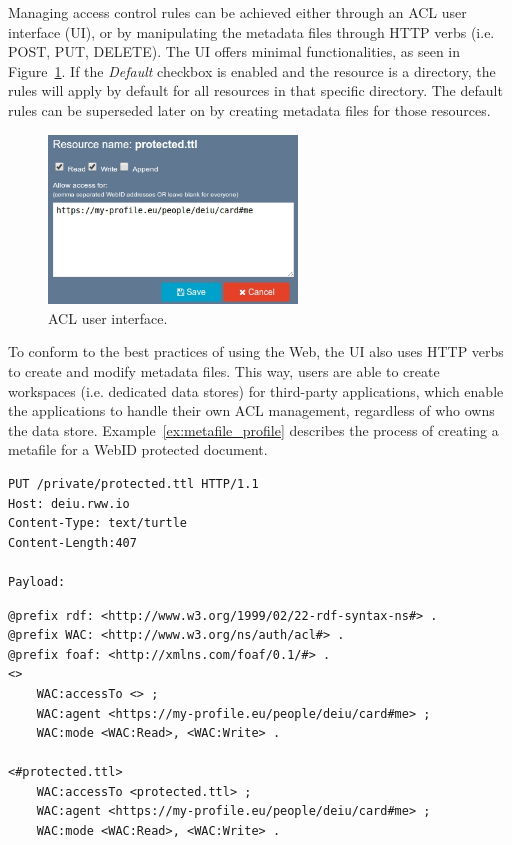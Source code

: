 Managing access control rules can be achieved either through an ACL user interface (UI), or by manipulating the metadata files through HTTP verbs (i.e. POST, PUT, DELETE). The UI offers minimal functionalities, as seen in Figure~\ref{fig:acl_ui}. If the \textit{Default} checkbox is enabled and the resource is a directory, the rules will apply by default for all resources in that specific directory. The default rules can be superseded later on by creating metadata files for those resources.\\

\begin{figure}[h]
  \begin{center}
    \includegraphics[width=250px]{img/screens/acl_ui.jpg}
        \caption{ACL user interface.}
        \label{fig:acl_ui}
  \end{center}
\end{figure}

To conform to the best practices of using the Web, the UI also uses HTTP verbs to create and modify metadata files. This way, users are able to create workspaces (i.e. dedicated data stores) for third-party applications, which enable the applications to handle their own ACL management, regardless of who owns the data store. Example~\ref{ex:metafile_profile} describes the process of creating a metafile for a WebID protected document.\\

\begin{example}[h]
\begin{verbatim}
PUT /private/protected.ttl HTTP/1.1
Host: deiu.rww.io
Content-Type: text/turtle
Content-Length:407

Payload:
\end{verbatim}
\begin{verbatim}
@prefix rdf: <http://www.w3.org/1999/02/22-rdf-syntax-ns#> .
@prefix WAC: <http://www.w3.org/ns/auth/acl#> .
@prefix foaf: <http://xmlns.com/foaf/0.1/#> .
<>
    WAC:accessTo <> ;
    WAC:agent <https://my-profile.eu/people/deiu/card#me> ;
    WAC:mode <WAC:Read>, <WAC:Write> .

<#protected.ttl>
    WAC:accessTo <protected.ttl> ;
    WAC:agent <https://my-profile.eu/people/deiu/card#me> ;
    WAC:mode <WAC:Read>, <WAC:Write> .
\end{verbatim}
\caption{Creating a metafile for the document \textit{/private/protected.ttl}.}
\label{ex:metafile_profile}
\end{example}

